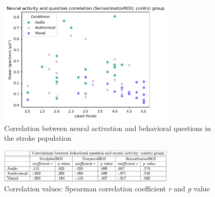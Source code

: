 \begin{figure}[H]
    \centering
    \includegraphics[width=0.75\textwidth]{scatter_plots/h_sensorimotor_q2.png}
    \caption{Correlation between neural activation and behavioral questions in the stroke population}
    \label{fig: correlation q2 sensorimotorROI: control group} 
\end{figure}
\begin{figure}[H]
    \centering
    \includegraphics[width=0.75\textwidth]{scatter_plots/correlation_q2_control.png}
    \caption{Correlation values: Spearman correlation coefficient \textit{r} and \textit{p} value}
    \label{fig: correlation values q2: control} 
\end{figure}

\clearpage
